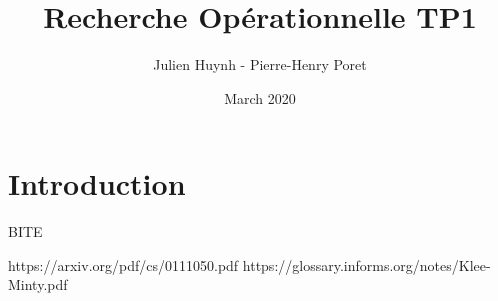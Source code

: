 \documentclass{article}
\title{Recherche Opérationnelle TP1}
\author{Julien Huynh - Pierre-Henry Poret }
\date{March 2020}
\begin{document}
\maketitle

\section{Introduction}

BITE

https://arxiv.org/pdf/cs/0111050.pdf
https://glossary.informs.org/notes/Klee-Minty.pdf
\end{document}
